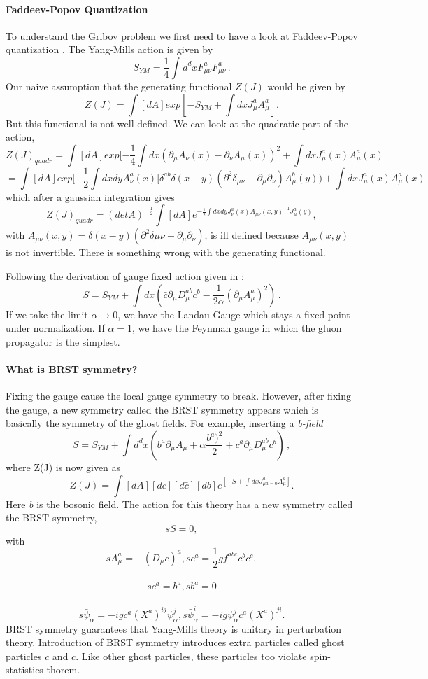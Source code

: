 \paragraph{Faddeev-Popov Quantization}
To understand the Gribov problem we first need to have a look at
Faddeev-Popov quantization . The Yang-Mills action
 is given by
\[
S_{YM}= \frac{1}{4}\int d^{d}x
F^{a}_{\mu\nu}F^{a}_{\mu\nu}
\,.
\]
Our naive assumption that the
generating functional $Z(J)$ would be given by $$Z(J)=\int
[dA]exp[-S_{YM}+\int dx J^{a}_{\mu}A^{a}_{\mu}].$$ But this functional is
not well defined. We can look at the quadratic part of the action,
$$Z(J)_{quadr}=\int[dA] exp[-\frac{1}{4}\int dx
(\partial_{\mu}A_{\nu}(x)-\partial_{\nu}A_{\mu}(x))^{2}+\int dx
J^{a}_{\mu}(x)A^{a}_{\mu}(x)$$ $$ =\int[dA] exp[-\frac{1}{2}\int dx dy
A^{a}_{\nu}(x)[\delta^{ab} \delta (x-y)(\partial^{2}
\delta_{\mu\nu}-\partial_{\mu}\partial_{\nu})A^{b}_{\mu}(y))+\int dx
J^{a}_{\mu}(x)A^{a}_{\mu}(x) $$ which after a gaussian integration gives
$$ Z(J)_{quadr}=(detA)^{-\frac{1}{2}} \int[dA] e^{-\frac{1}{2}\int dx dy
J^{a}_{\nu}(x) A_{\mu\nu}(x,y)^{-1} J^{a}_{\mu}(y)},$$ with
$A_{\mu\nu}(x,y)=
\delta(x-y)(\partial^{2}\delta{\mu\nu}-\partial_{\mu}\partial_{\nu})$,
is ill defined because $A_{\mu\nu}(x,y)$ is not invertible. There is
something wrong with the generating functional.

Following the derivation of gauge fixed action given in
:
\[
S=S_{YM}+\int dx (\bar{c}\partial_{\mu}D^{ab}_{\mu}c^{b}
 -\frac{1}{2 \alpha}(\partial_{\mu}A^{a}_{\mu})^{2})
\,.
\]
If we take the limit $\alpha \rightarrow 0$, we have the Landau Gauge
which stays a fixed point under normalization. If $\alpha=1$, we have the
Feynman gauge in which the gluon propagator is the simplest.

\paragraph{What is BRST symmetry?}
Fixing the gauge cause the local gauge symmetry to break. However, after
fixing the gauge, a new symmetry called the BRST symmetry appears which
is basically the symmetry of the ghost fields. For example, inserting
a \emph{b-field}
\[
S=S_{YM} + \int d^{d}x (
b^{a} \partial_{\mu} A_{\mu}
+\alpha \frac{b^{a})^2}{2}
+ \bar{c}^{a}\partial_{\mu}D^{ab}_{\mu}c^{b}
                    )
\,,
\]
where Z(J) is now given as
$$Z(J)=\int[dA][dc][d\bar{c}][db]
e^{[-S+\int dx J^{a}_{\mu{a}=0}A^{a}_{\mu}]}.$$
Here \emph{b} is the
bosonic field. The action for this theory has a new symmetry called the
BRST symmetry, $$sS=0,$$ with $$s A^{a}_{\mu}=-(D_{\mu}c)^{a},
sc^{a}=\frac{1}{2}gf^{abc}c^{b}c^{c},$$\\ $$s\bar{c}^{a}=b^{a}, sb^{a}=0
$$ \\
$$s\bar{\psi}_{\alpha}=-i g c^{a} (X^{a})^{ij} \psi^{j}_{\alpha}, s\bar{\psi}^{i}_{\alpha}=-i g \psi^{j}_{\alpha} c^{a} (X^{a})^{ji}.$$
BRST symmetry guarantees that Yang-Mills theory is unitary in
perturbation theory. Introduction of BRST symmetry introduces extra
particles called ghost particles $c$ and $\bar{c}$. Like other ghost
particles, these particles too violate spin-statistics thorem.

